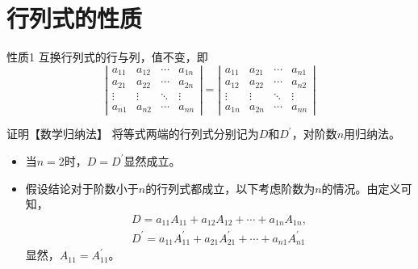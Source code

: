 \section{行列式的性质}
\begin{frame}
  \begin{block}{性质1}
    互换行列式的行与列，值不变，即
    \begin{equation}
      \left|
      \begin{array}{cccc}
        a_{11}  &  a_{12} & \cdots & a_{1n} \\
        a_{21}  &  a_{22} & \cdots & a_{2n} \\
        \vdots & \vdots & \ddots & \vdots\\  
        a_{n1}  &  a_{n2} & \cdots & a_{nn} 
      \end{array}
      \right|
      =
      \left|
      \begin{array}{cccc}
        a_{11}  &  a_{21} & \cdots & a_{n1} \\
        a_{12}  &  a_{22} & \cdots & a_{n2} \\
        \vdots & \vdots & \ddots & \vdots\\  
        a_{1n}  &  a_{2n} & \cdots & a_{nn} 
      \end{array}
      \right|
    \end{equation}

  \end{block}
\end{frame}


\begin{frame}
  \begin{block}{证明【数学归纳法】}
    将等式两端的行列式分别记为$D$和$D^\prime$，对阶数$n$用归纳法。\pause
    \begin{itemize}
    \item 当$n=2$时，$D=D^\prime$显然成立。\pause 
    \item 假设结论对于阶数小于$n$的行列式都成立，以下考虑阶数为$n$的情况。由定义可知，
      $$
      \begin{array}{c}
        D = a_{11} A_{11}+a_{12}A_{12}+\cdots+a_{1n}A_{1n}, \\[0.1in]
        D^\prime = a_{11} A^\prime_{11}+a_{21}A^\prime_{21}+\cdots+a_{n1}A^\prime_{n1}
      \end{array}
      $$
      显然，$A_{11}=A^\prime_{11}$。    \end{itemize}
  \end{block}
\end{frame}


